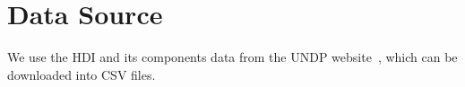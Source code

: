 \section{Data Source}
We use the HDI and its components data from the UNDP website~\cite{HDIcomponents,HDIinfo}, which can be downloaded into CSV files.
